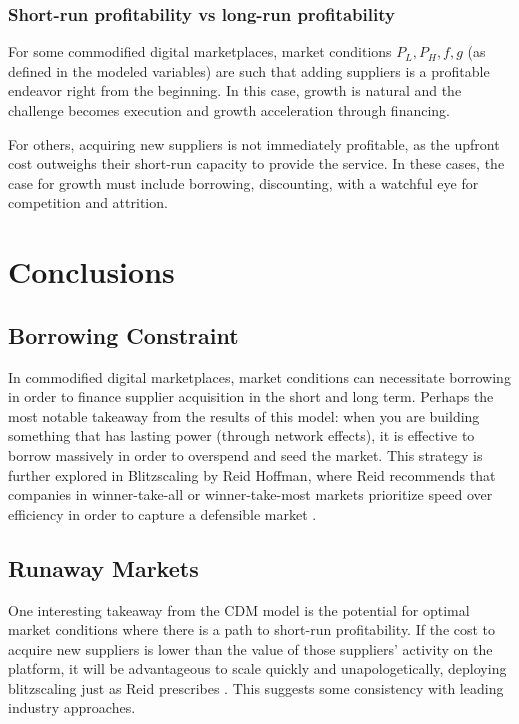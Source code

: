 \subsubsection{Short-run profitability vs long-run profitability}

For some commodified digital marketplaces, market conditions $ P_L, P_H, f, g $ (as defined in the modeled variables) are such that adding suppliers is a profitable endeavor right from the beginning. In this case, growth is natural and the challenge becomes execution and growth acceleration through financing.

For others, acquiring new suppliers is not immediately profitable, as the upfront cost outweighs their short-run capacity to provide the service. In these cases, the case for growth must include borrowing, discounting, with a watchful eye for competition and attrition.

\section{Conclusions}

\subsection{Borrowing Constraint}
In commodified digital marketplaces, market conditions can necessitate borrowing in order to finance supplier acquisition in the short and long term. Perhaps the most notable takeaway from the results of this model: when you are building something that has lasting power (through network effects), it is effective to borrow massively in order to overspend and seed the market. This strategy is further explored in Blitzscaling by Reid Hoffman, where Reid recommends that companies in winner-take-all or winner-take-most markets prioritize speed over efficiency in order to capture a defensible market \citep{blitzscaling}.

\subsection{Runaway Markets}
One interesting takeaway from the CDM model is the potential for optimal market conditions where there is a path to short-run profitability. If the cost to acquire new suppliers is lower than the value of those suppliers' activity on the platform, it will be advantageous to scale quickly and unapologetically, deploying blitzscaling just as Reid prescribes \citep{blitzscaling}. This suggests some consistency with leading industry approaches.

